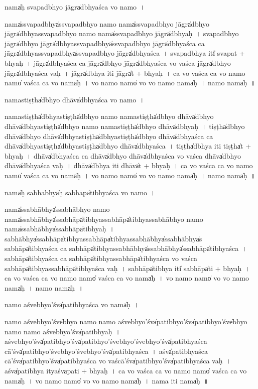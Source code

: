 \documentclass[parskip, DIV=14]{scrartcl}
\begin{document}
{nama̍ḥ sva॒padbhyo॒ jāgra̍dbhyaśca vo॒ namo~।

nama̍ssva॒padbhya̍ssva॒padbhyo॒ namo॒ nama̍ssva॒padbhyo॒ jāgra̍dbhyo॒  jāgra̍dbhyassva॒padbhyo॒ namo॒ nama̍ssva॒padbhyo॒ jāgra̍dbhyaḥ~।
sva॒padbhyo॒ jāgra̍dbhyo॒  jāgra̍dbhyassva॒padbhya̍ssva॒padbhyo॒ jāgra̍dbhyaśca ca॒ jāgra̍dbhyassva॒padbhya̍ssva॒padbhyo॒ jāgra̍dbhyaśca~।
sva॒padbhya॒ iti̍ sva॒pat + bhya॒ḥ~।
jāgra̍dbhyaśca ca॒ jāgra̍dbhyo॒ jāgra̍dbhyaśca vo vaśca॒ jāgra̍dbhyo॒ jāgra̍dbhyaśca vaḥ~।
jāgra̍dbhya॒ iti॒ jāgra̍t + bhya॒ḥ~।
ca॒ vo॒ va॒śca॒ ca॒ vo॒ namo॒ namo̍ vaśca ca vo॒ nama̍ḥ~।
vo॒ namo॒ namo̍ vo vo॒ namo॒ nama̍ḥ~।
namo॒ nama̍ḥ~॥ 

nama॒stiṣṭha̍dbhyo॒ dhāva̍dbhyaśca vo॒ namo~।

nama॒stiṣṭha̍dbhya॒stiṣṭha̍dbhyo॒ namo॒ nama॒stiṣṭha̍dbhyo॒ dhāva̍dbhyo॒ dhāva̍dbhya॒stiṣṭha̍dbhyo॒ namo॒ nama॒stiṣṭha̍dbhyo॒ dhāva̍dbhyaḥ~।
tiṣṭha̍dbhyo॒ dhāva̍dbhyo॒ dhāva̍dbhya॒stiṣṭha̍dbhya॒stiṣṭha̍dbhyo॒ dhāva̍dbhyaśca ca॒ dhāva̍dbhya॒stiṣṭha̍dbhya॒stiṣṭha̍dbhyo॒ dhāva̍dbhyaśca~।
tiṣṭha̍dbhya॒ iti॒ tiṣṭha̍t + bhya॒ḥ~।
dhāva̍dbhyaśca ca॒ dhāva̍dbhyo॒ dhāva̍dbhyaśca vo vaśca॒ dhāva̍dbhyo॒ dhāva̍dbhyaśca vaḥ~।
dhāva̍dbhya॒ iti॒ dhāva̍t + bhya॒ḥ~।
ca॒ vo॒ va॒śca॒ ca॒ vo॒ namo॒ namo̍ vaśca ca vo॒ nama̍ḥ~।
vo॒ namo॒ namo̍ vo vo॒ namo॒ nama̍ḥ~।
namo॒ nama̍ḥ~॥ 

nama̍ḥ sa॒bhābhya̍ḥ sa॒bhāpa̍tibhyaśca vo॒ namo~।

nama̍ssa॒bhābhya̍ssa॒bhābhyo॒ namo॒ nama̍ssa॒bhābhya̍ssa॒bhāpa̍tibhyassa॒bhāpa̍tibhyassa॒bhābhyo॒ namo॒ nama̍ssa॒bhābhya̍ssa॒bhāpa̍tibhyaḥ~।
sa॒bhābhya̍ssa॒bhāpa̍tibhyassa॒bhāpa̍tibhyassa॒bhābhya̍ssa॒bhābhya̍s sa॒bhāpa̍tibhyaśca ca sa॒bhāpa̍tibhyassa॒bhābhya̍ssa॒bhābhya̍ssa॒bhāpa̍tibhyaśca~।
sa॒bhāpa̍tibhyaśca ca sa॒bhāpa̍tibhyassa॒bhāpa̍tibhyaśca vo vaśca sa॒bhāpa̍tibhyassa॒bhāpa̍tibhyaśca vaḥ~।
sa॒bhāpa̍tibhya॒ iti̍ sa॒bhāpa̍ti + bhya॒ḥ~।
ca॒ vo॒ va॒śca॒ ca॒ vo॒ namo॒ namo̍ vaśca ca vo॒ nama̍ḥ~।
vo॒ namo॒ namo̍ vo vo॒ namo॒ nama̍ḥ~।
namo॒ nama̍ḥ~॥ 

namo॒ aśve॒bhyo'śva̍patibhyaśca vo॒ nama̍ḥ~।

namo॒ aśve॒bhyo'śve̎bhyo॒ namo॒ namo॒ aśve॒bhyo'śva̍pati॒bhyo'śva̍pati॒bhyo'śve̎bhyo॒ namo॒ namo॒ aśve॒bhyo'śva̍patibhyaḥ~।
aśve॒bhyo'śva̍pati॒bhyo'śva̍pati॒bhyo'śve॒bhyo'śve॒bhyo'śva̍patibhyaśca॒ cā'śva̍pati॒bhyo'śve॒bhyo'śve॒bhyo'śva̍patibhyaśca~।
aśva̍patibhyaśca॒ cā'śva̍pati॒bhyo'śva̍patibhyaśca vo va॒ścā'śva̍pati॒bhyo'śva̍patibhyaśca vaḥ~।
aśva̍patibhya॒ ityaśva̍pati + bhya॒ḥ~।
ca॒ vo॒ va॒śca॒ ca॒ vo॒ namo॒ namo̍ vaśca ca vo॒ nama̍ḥ~।
vo॒ namo॒ namo̍ vo vo॒ namo॒ nama̍ḥ~।
nama॒ iti॒ nama̍ḥ~॥ 

}
\end{document}
